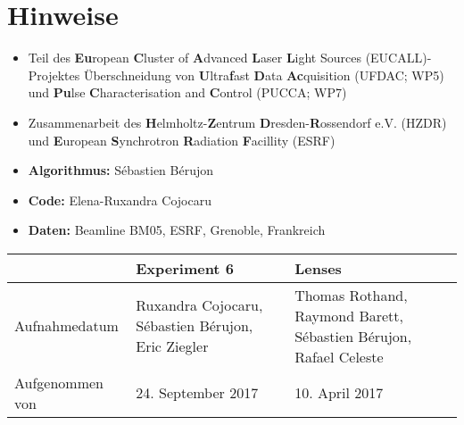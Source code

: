 \section{Hinweise}

\begin{frame}
	\begin{itemize}
		\item Teil des \textbf{Eu}ropean \textbf{C}luster of \textbf{A}dvanced \textbf{L}aser \textbf{L}ight Sources (EUCALL)-Projektes
		\rightarrow Überschneidung von \textbf{U}ltra\textbf{f}ast \textbf{D}ata \textbf{Ac}quisition (UFDAC; WP5) und \textbf{Pu}lse \textbf{C}haracterisation and \textbf{C}ontrol (PUCCA; WP7)
		\item Zusammenarbeit des \textbf{H}elmholtz-\textbf{Z}entrum \textbf{D}resden-\textbf{R}ossendorf e.V. (HZDR) und \textbf{E}uropean \textbf{S}ynchrotron \textbf{R}adiation \textbf{F}acillity (ESRF)
		\item \textbf{Algorithmus:} Sébastien Bérujon
		\item \textbf{Code:} Elena-Ruxandra Cojocaru
		\item \textbf{Daten:} Beamline BM05, ESRF, Grenoble, Frankreich
	\end{itemize}
	
	
	\begin{tabularx}{\textwidth}{@{} XXX @{}}
		\toprule
		& \textbf{Experiment 6} & \textbf{Lenses} \\
		\hline
		Aufnahmedatum & Ruxandra Cojocaru, Sébastien Bérujon, Eric Ziegler & Thomas Rothand, Raymond Barett, Sébastien Bérujon, Rafael Celeste \\
		Aufgenommen von & 24. September 2017 & 10. April 2017 \\
		\bottomrule
	\end{tabularx}
\end{frame}